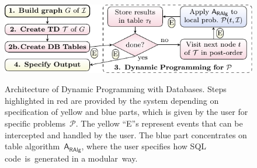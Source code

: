 \documentclass{llncs}
\newcommand{\algo}[1]{\ensuremath{\mathsf{#1}}}
\begin{document}
%
%
\begin{figure}[t]%
\centering
  {\noindent\includegraphics[]{1-figs/figure.pdf}}
  \caption{Architecture of Dynamic Programming with Databases. Steps highlighted in red are provided by the system depending on specification of yellow and blue parts, which is given by the user for specific problems~$\mathcal{P}$. The yellow ``E''s represent events that can be intercepted and handled by the user. 
  The blue part concentrates on table algorithm~$\algo{A_{RAlg}}$, where the user specifies how SQL code~is~generated in a modular~way.}
  \label{fig:arch}
%
\end{figure}
\end{document}
